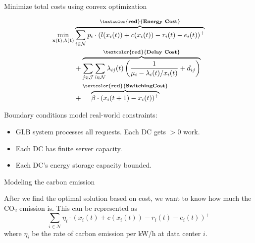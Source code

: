 \documentclass[xcolor=dvipsnames]{beamer}
\newcommand{\carbondioxide}{\ensuremath{\mathrm{CO}_2}}
\begin{document}
\begin{frame}{Minimize total costs using convex optimization}

\begin{align*}
\min_{\bf{x}(t), \bf{\lambda}(t)} 
& \overbrace{ \sum_{i \in \mathcal{N}} p_i \cdot (l(x_i(t)) + c(x_i(t)) - r_i(t) - e_i(t))^+ }^{\bf \textcolor{red}{Energy \ Cost}} \\
& + \overbrace{ \sum_{j \in \mathcal{J}}\sum_{i \in \mathcal{N}} 
\lambda_{ij}(t)\left(\frac{1}{\mu_i - \lambda_i(t)/x_i(t)} + d_{ij}\right) }^{\bf \textcolor{red}{Delay \ Cost}}  \\
& + \overbrace{ \beta \cdot (x_i(t+1) - x_i(t))^+ }^{\bf \textcolor{red}{Switching Cost}}
\end{align*}
\vspace{-2mm}


	\begin{block}{Boundary conditions model real-world constraints:}
	\begin{itemize}
	\item
	GLB system processes all requests. Each DC gets $>0$ work.
	\item
	Each DC has finite server capacity. %
	\item
	Each DC's energy storage capacity bounded.
	\end{itemize}
	\end{block}
\end{frame}

\begin{frame}{Modeling the carbon emission}

After we find the optimal solution based on cost, we want to know how much the \carbondioxide{} emission is. This can be represented as 
	$$\sum_{i \in \mathcal{N}} \eta_i \cdot (x_i(t) + c(x_i(t)) - r_i(t) - e_i(t))^+$$
where $\eta_i$ be the rate of carbon emission per kW/h at data center $i$.
\end{frame}
\end{document}

